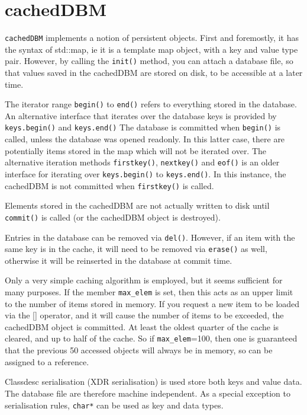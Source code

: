 \section{cachedDBM}\label{cachedDBM}

{\tt cachedDBM} implements a notion of persistent objects. First and
foremostly, it has the syntax of std::map, ie it is a template map
object, with a key and value type pair. However, by calling the
\verb+init()+ method, you can attach a database file, so that values
saved in the cachedDBM are stored on disk, to be accessible at a later
time.

The iterator range \verb+begin()+ to \verb+end()+ refers to everything
stored in the database. An alternative interface that iterates over
the database keys is provided by \verb+keys.begin()+ and
\verb+keys.end()+ The database is committed when \verb+begin()+ is
called, unless the database was opened readonly. In this latter case,
there are potentially items stored in the map which will not be
iterated over. The alternative iteration
methods \verb+firstkey()+, \verb+nextkey()+ and \verb+eof()+ is an
older interface for iterating over \verb+keys.begin()+ to
\verb+keys.end()+.  In this instance, the cachedDBM is not committed
when \verb+firstkey()+ is called.

Elements stored in the cachedDBM are not actually written to disk until
\verb+commit()+ is called (or the cachedDBM object is
destroyed). 

Entries in the database can be removed via \verb+del()+. However, if
an item with the same key is in the cache, it will need to be removed via
\verb+erase()+ as well, otherwise it will be reinserted in the
database at commit time.

Only a very simple caching algorithm is employed, but it seems
sufficient for many purposes. If the member \verb+max_elem+ is set,
then this acts as an upper limit to the number of items stored in
memory. If you request a new item to be loaded via the [] operator,
and it will cause the number of items to be exceeded, the cachedDBM
object is committed. At least the oldest quarter of the cache is cleared,
and up to half of the cache. So if \verb+max_elem+=100, then one is
guaranteed that the previous 50 accessed objects will always be in
memory, so can be assigned to a reference.

Classdesc serialisation (XDR serialisation) is used store both keys
and value data. The database file are therefore machine independent.
As a special exception to serialisation rules, \verb+char*+ can be
used as key and data types.


